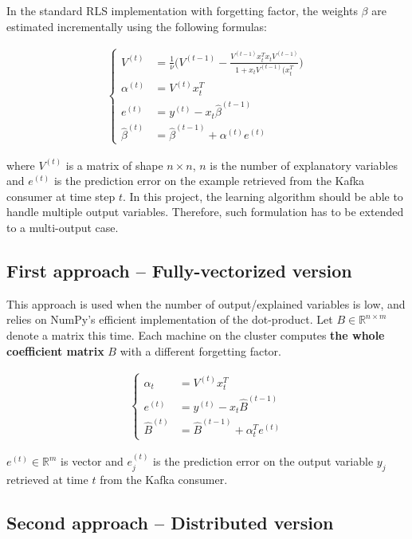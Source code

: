 In the standard RLS implementation with forgetting factor,
the weights $\beta$ are estimated incrementally using the following formulas:

\begin{align}
\begin{cases}
    V^{(t)} & = \frac{1}{\nu} \Bigg( V^{(t-1)} - \frac{V^{(t-1)} x_t^T x_t V^{(t-1)}}{1 + x_t V^{(t-1)} (x_t^T} \Bigg) \\
    \alpha^{(t)} & = V^{(t)} x_t^T \\
    e^{(t)} & = y^{(t)} - x_t \hat{\beta}^{(t-1)} \\
    \hat{\beta}^{(t)} & = \hat{\beta}^{(t-1)} + \alpha^{(t)} e^{(t)}
\end{cases}
\end{align}

where $V^{(t)}$ is a matrix of shape $n \times n$, $n$ is the number of explanatory variables
and $e^{(t)}$ is the prediction error on the example retrieved from the Kafka consumer at time step $t$.
In this project, the learning algorithm should be able to handle multiple output variables.
Therefore, such formulation has to be extended to a multi-output case.

\subsection{First approach -- Fully-vectorized version}

This approach is used when the number of output/explained variables is low,
and relies on NumPy's efficient implementation of the dot-product.
Let $B \in \mathbb{R}^{n \times m}$ denote a matrix this time.
Each machine on the cluster computes \textbf{the whole coefficient matrix} $B$
with a different forgetting factor.

\begin{align}
\begin{cases}
    \alpha_t & = V^{(t)} x_t^T \\
    e^{(t)} & = y^{(t)} - x_t \hat{B}^{(t-1)} \\
    \hat{B}^{(t)} & = \hat{B}^{(t-1)} + \alpha_t^T e^{(t)}
\end{cases}
\end{align}

$e^{(t)} \in \mathbb{R}^m$ is vector and $e_j^{(t)}$ is the prediction error
on the output variable $y_j$ retrieved at time $t$ from the Kafka consumer.


\subsection{Second approach -- Distributed version}

